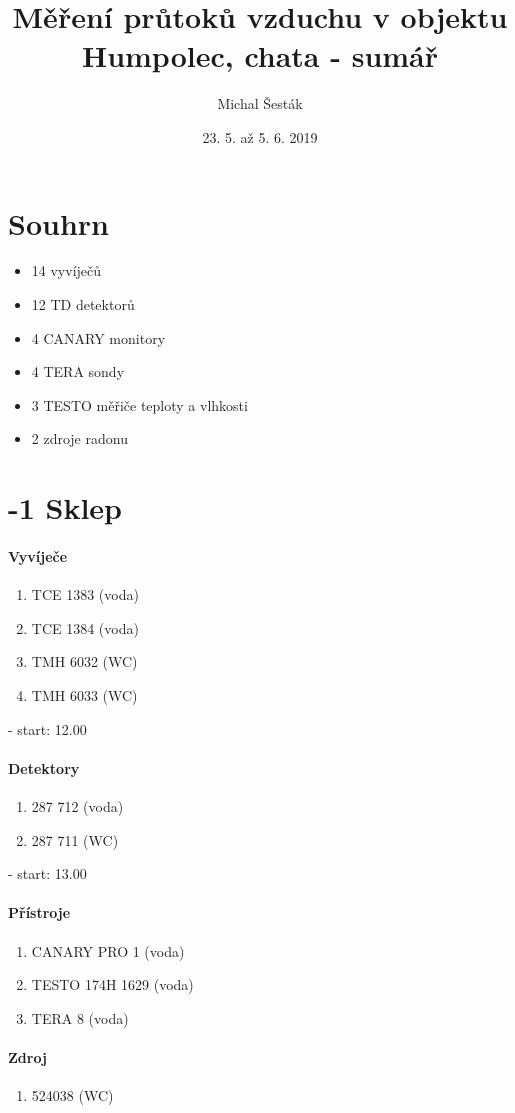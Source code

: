 \documentclass[11pt,a4paper]{article}
\author{Michal Šesták}
\date{23. 5. až 5. 6. 2019}
\title{Měření průtoků vzduchu v objektu Humpolec, chata - sumář}
\begin{document}
\maketitle
\section*{Souhrn}
\begin{itemize}
	\item 14 vyvíječů
	\item 12 TD detektorů
	\item 4 CANARY monitory
	\item 4 TERA sondy
	\item 3 TESTO měřiče teploty a vlhkosti
	\item 2 zdroje radonu
\end{itemize}
\section*{-1 Sklep}
\paragraph{Vyvíječe}
	\begin{enumerate}
		\item TCE 1383 (voda)
		\item TCE 1384 (voda)
		\item TMH 6032 (WC)
		\item TMH 6033 (WC)
	\end{enumerate}
- start: 12.00
\paragraph{Detektory}
	\begin{enumerate}
		\item 287 712 (voda)
		\item 287 711 (WC)
	\end{enumerate}
- start: 13.00
\paragraph{Přístroje}
	\begin{enumerate}
	\item CANARY PRO 1 (voda)
	\item TESTO 174H 1629 (voda)
	\item TERA 8 (voda)
	\end{enumerate}
\paragraph{Zdroj}
	\begin{enumerate}
	\item 524038 (WC)
	\end{enumerate}
\end{document}
